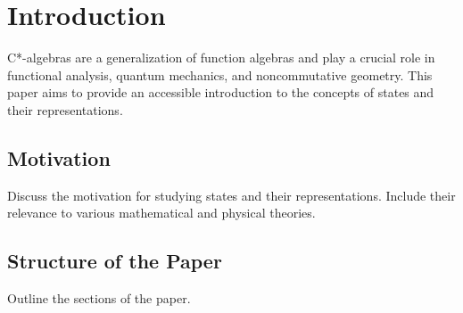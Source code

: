 \section{Introduction}
\label{sec:intro}
C*-algebras are a generalization of function algebras and play a crucial role in functional analysis, quantum mechanics, and noncommutative geometry. This paper aims to provide an accessible introduction to the concepts of states and their representations.



\subsection{Motivation}
Discuss the motivation for studying states and their representations. Include their relevance to various mathematical and physical theories.

\subsection{Structure of the Paper}
Outline the sections of the paper.
